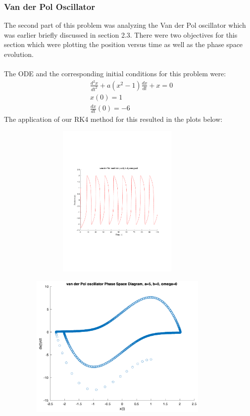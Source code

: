 \documentclass{article}
\begin{document}
\subsubsection{Van der Pol Oscillator}
The second part of this problem was analyzing the Van der Pol oscillator which was earlier briefly discussed in section 2.3. There were two objectives for this section which were plotting the position versus time as well as the phase space evolution. \\
\\
The ODE and the corresponding initial conditions for this problem were:
\begin{align*}
    & \frac{d^2x}{dt^2} + a(x^2-1) \frac{dx}{dt} + x = 0\\
    & x(0) = 1\\
    & \frac{dx}{dt}(0) = -6
\end{align*}
The application of our RK4 method for this resulted in the plots below:
\begin{figure}[!h]
    \centering
    \includegraphics[width=10cm, height=7.5cm]{figures/vdp_Position.pdf}
\end{figure}
\begin{figure}[!h]
    \centering
    \includegraphics[width=10cm, height=7cm]{figures/vdp_phaseSpace.png}
\end{figure}
\\
\end{document}
